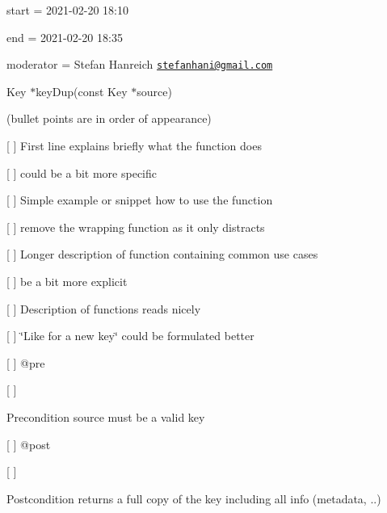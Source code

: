 
\begin{DoxyItemize}
\item start = 2021-\/02-\/20 18\+:10
\item end = 2021-\/02-\/20 18\+:35
\item moderator = Stefan Hanreich \href{mailto:stefanhani@gmail.com}{\tt stefanhani@gmail.\+com}
\end{DoxyItemize}

{\ttfamily Key $\ast$key\+Dup(const Key $\ast$source)}

(bullet points are in order of appearance)


\begin{DoxyItemize}
\item \mbox{[} \mbox{]} First line explains briefly what the function does
\begin{DoxyItemize}
\item \mbox{[} \mbox{]} could be a bit more specific
\end{DoxyItemize}
\item \mbox{[} \mbox{]} Simple example or snippet how to use the function
\begin{DoxyItemize}
\item \mbox{[} \mbox{]} remove the wrapping function as it only distracts
\end{DoxyItemize}
\item \mbox{[} \mbox{]} Longer description of function containing common use cases
\begin{DoxyItemize}
\item \mbox{[} \mbox{]} be a bit more explicit
\end{DoxyItemize}
\item \mbox{[} \mbox{]} Description of functions reads nicely
\begin{DoxyItemize}
\item \mbox{[} \mbox{]} \char`\"{}\+Like for a new key\char`\"{} could be formulated better
\end{DoxyItemize}
\item \mbox{[} \mbox{]} {\ttfamily @pre}
\begin{DoxyItemize}
\item \mbox{[} \mbox{]} \begin{DoxyPrecond}{Precondition}
source must be a valid key
\end{DoxyPrecond}

\end{DoxyItemize}
\item \mbox{[} \mbox{]} {\ttfamily @post}
\begin{DoxyItemize}
\item \mbox{[} \mbox{]} \begin{DoxyPostcond}{Postcondition}
returns a full copy of the key including all info (metadata, ..)
\end{DoxyPostcond}


\end{DoxyItemize}
\end{DoxyItemize}
